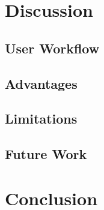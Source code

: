 \section{Discussion}


\subsection{User Workflow}


\subsection{Advantages}


\subsection{Limitations}


\subsection{Future Work}


\section{Conclusion}








